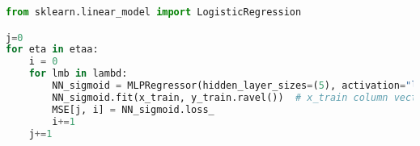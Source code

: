 \begin{lstlisting}[language=Python]
from sklearn.linear_model import LogisticRegression

j=0
for eta in etaa:
    i = 0
    for lmb in lambd:
        NN_sigmoid = MLPRegressor(hidden_layer_sizes=(5), activation="logistic", solver="sgd", alpha=lmb, batch_size = batch_size, learning_rate_init = eta, momentum = 0, max_iter=n_epochs ,n_iter_no_change=2000)
        NN_sigmoid.fit(x_train, y_train.ravel())  # x_train column vector with input values, y_train column vector with target values
        MSE[j, i] = NN_sigmoid.loss_  
        i+=1
    j+=1
\end{lstlisting}



